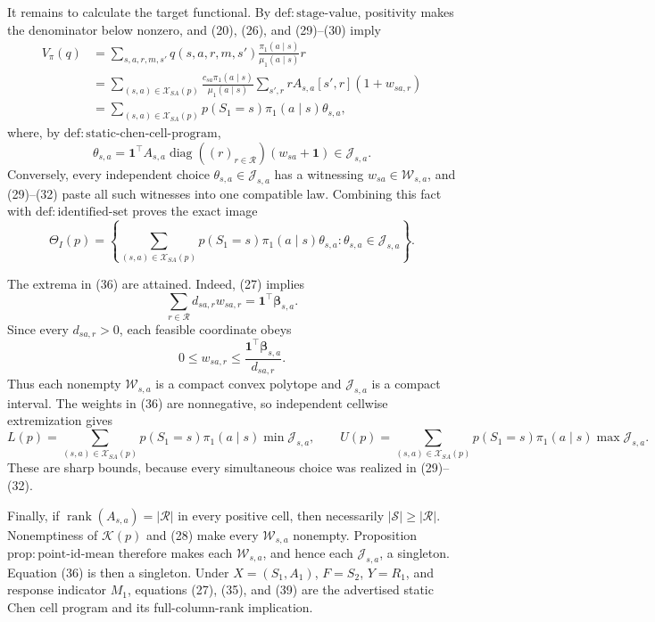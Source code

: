 It remains to calculate the target functional.  By \(\mathrm{def{:}stage\text{-}value}\), positivity makes the denominator below nonzero, and (20), (26), and (29)--(30) imply
\[
\begin{aligned}
 V_\pi(q)
 &=\sum_{s,a,r,m,s'}q(s,a,r,m,s')
   \frac{\pi_1(a\mid s)}{\mu_1(a\mid s)}r\\
 &=\sum_{(s,a)\in\mathcal X_{SA}(p)}
   \frac{c_{sa}\pi_1(a\mid s)}{\mu_1(a\mid s)}
   \sum_{s',r}rA_{s,a}[s',r](1+w_{sa,r})\\
 &=\sum_{(s,a)\in\mathcal X_{SA}(p)}
   p(S_1=s)\pi_1(a\mid s)\theta_{s,a},
\end{aligned}
\tag{34}
\]
where, by \(\mathrm{def{:}static\text{-}chen\text{-}cell\text{-}program}\),
\[
 \theta_{s,a}=\mathbf 1^\top A_{s,a}
 \operatorname{diag}((r)_{r\in\mathcal R})(w_{sa}+\mathbf 1)
 \in\mathcal J_{s,a}.
\tag{35}
\]
Conversely, every independent choice \(\theta_{s,a}\in\mathcal J_{s,a}\) has a witnessing \(w_{sa}\in\mathcal W_{s,a}\), and (29)--(32) paste all such witnesses into one compatible law.  Combining this fact with \(\mathrm{def{:}identified\text{-}set}\) proves the exact image
\[
 \Theta_I(p)=\left\{
 \sum_{(s,a)\in\mathcal X_{SA}(p)}p(S_1=s)\pi_1(a\mid s)\theta_{s,a}:
 \theta_{s,a}\in\mathcal J_{s,a}
 \right\}.
\tag{36}
\]

The extrema in (36) are attained.  Indeed, (27) implies
\[
 \sum_{r\in\mathcal R}d_{sa,r}w_{sa,r}
 =\mathbf 1^\top\boldsymbol\beta_{s,a}.
\tag{37}
\]
Since every \(d_{sa,r}>0\), each feasible coordinate obeys
\[
 0\leq w_{sa,r}\leq
 \frac{\mathbf 1^\top\boldsymbol\beta_{s,a}}{d_{sa,r}}.
\tag{38}
\]
Thus each nonempty \(\mathcal W_{s,a}\) is a compact convex polytope and \(\mathcal J_{s,a}\) is a compact interval.  The weights in (36) are nonnegative, so independent cellwise extremization gives
\[
 L(p)=\sum_{(s,a)\in\mathcal X_{SA}(p)}p(S_1=s)\pi_1(a\mid s)\min\mathcal J_{s,a},
 \qquad
 U(p)=\sum_{(s,a)\in\mathcal X_{SA}(p)}p(S_1=s)\pi_1(a\mid s)\max\mathcal J_{s,a}.
\tag{39}
\]
These are sharp bounds, because every simultaneous choice was realized in (29)--(32).

Finally, if \(\operatorname{rank}(A_{s,a})=|\mathcal R|\) in every positive cell, then necessarily \(|\mathcal S|\geq|\mathcal R|\).  Nonemptiness of \(\mathcal K(p)\) and (28) make every \(\mathcal W_{s,a}\) nonempty.  Proposition \(\mathrm{prop{:}point\text{-}id\text{-}mean}\) therefore makes each \(\mathcal W_{s,a}\), and hence each \(\mathcal J_{s,a}\), a singleton.  Equation (36) is then a singleton.  Under \(X=(S_1,A_1)\), \(F=S_2\), \(Y=R_1\), and response indicator \(M_1\), equations (27), (35), and (39) are the advertised static Chen cell program and its full-column-rank implication.

